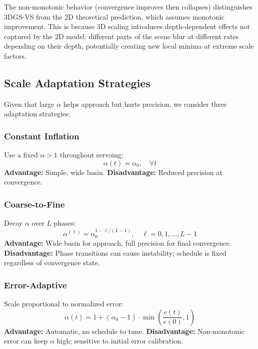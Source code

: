 \documentclass[11pt]{article}
\begin{document}
The non-monotonic behavior (convergence improves then collapses) distinguishes 3DGS-VS from the 2D theoretical prediction, which assumes monotonic improvement. This is because 3D scaling introduces depth-dependent effects not captured by the 2D model: different parts of the scene blur at different rates depending on their depth, potentially creating new local minima at extreme scale factors.

\subsection{Scale Adaptation Strategies}

Given that large $\alpha$ helps approach but hurts precision, we consider three adaptation strategies:

\subsubsection{Constant Inflation}

Use a fixed $\alpha > 1$ throughout servoing:
\begin{equation}
    \alpha(t) = \alpha_0, \quad \forall t
\end{equation}
\textbf{Advantage:} Simple, wide basin. \textbf{Disadvantage:} Reduced precision at convergence.

\subsubsection{Coarse-to-Fine}

Decay $\alpha$ over $L$ phases:
\begin{equation}
    \alpha^{(\ell)} = \alpha_0^{1 - \ell/(L-1)}, \quad \ell = 0, 1, \ldots, L-1
\end{equation}
\textbf{Advantage:} Wide basin for approach, full precision for final convergence. \textbf{Disadvantage:} Phase transitions can cause instability; schedule is fixed regardless of convergence state.

\subsubsection{Error-Adaptive}

Scale proportional to normalized error:
\begin{equation}
    \alpha(t) = 1 + (\alpha_0 - 1) \cdot \min\left(\frac{e(t)}{e(0)}, 1\right)
\end{equation}
\textbf{Advantage:} Automatic, no schedule to tune. \textbf{Disadvantage:} Non-monotonic error can keep $\alpha$ high; sensitive to initial error calibration.
\end{document}
